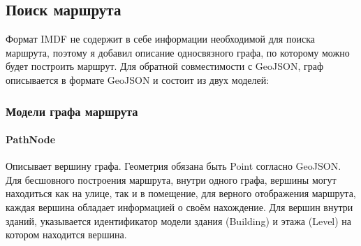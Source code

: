    \subsection{Поиск маршрута}
      Формат IMDF не содержит в себе информации необходимой для поиска маршрута, поэтому я добавил описание односвязного графа, по которому можно будет построить маршрут. Для обратной совместимости с GeoJSON, граф описывается в формате GeoJSON и состоит из двух моделей:
      \subsubsection{Модели графа маршрута}
        \paragraph{PathNode}
          Описывает вершину графа. Геометрия обязана быть Point согласно GeoJSON. Для бесшовного построения маршрута, внутри одного графа, вершины могут находиться как на улице, так и в помещение, для верного отображения маршрута, каждая вершина обладает информацией о своём нахождение. Для вершин внутри зданий, указывается идентификатор модели здания (Building) и этажа (Level) на котором находится вершина.
